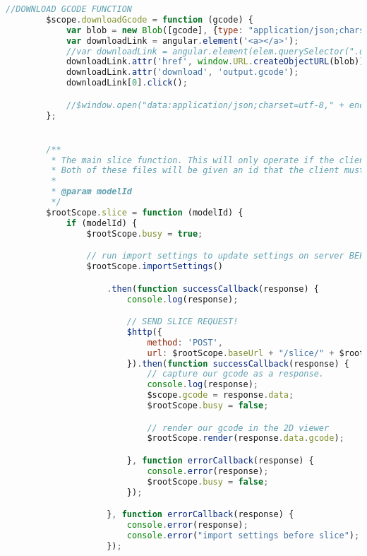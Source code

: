 \begin{lstlisting}[language=JavaScript, label={lst:app}, caption=Main app code where the angular module WebSlicer is defined. This is similar to a main function in C++.]
        //DOWNLOAD GCODE FUNCTION
        $scope.downloadGcode = function (gcode) {
            var blob = new Blob([gcode], {type: "application/json;charset=utf-8;"});
            var downloadLink = angular.element('<a></a>');
            //var downloadLink = angular.element(elem.querySelector(".downloadGcode"));
            downloadLink.attr('href', window.URL.createObjectURL(blob));
            downloadLink.attr('download', 'output.gcode');
            downloadLink[0].click();

            //$window.open("data:application/json;charset=utf-8," + encodeURIComponent(gcode));
        };


        /**
         * The main slice function. This will only operate if the client has both uploaded a settings file and a model file.
         * Both of these files will be given an id that the client must track in order to slice a file properly.
         *
         * @param modelId
         */
        $rootScope.slice = function (modelId) {
            if (modelId) {
                $rootScope.busy = true;

                // run import settings to update settings on server BEFORE SLICING
                $rootScope.importSettings()

                    .then(function successCallback(response) {
                        console.log(response);

                        // SEND SLICE REQUEST!
                        $http({
                            method: 'POST',
                            url: $rootScope.baseUrl + "/slice/" + $rootScope.clientId + "/" + modelId
                        }).then(function successCallback(response) {
                            // capture our gcode as a response.
                            console.log(response);
                            $scope.gcode = response.data;
                            $rootScope.busy = false;

                            // render our gcode in the 2D viewer
                            $rootScope.render(response.data.gcode);

                        }, function errorCallback(response) {
                            console.error(response);
                            $rootScope.busy = false;
                        });

                    }, function errorCallback(response) {
                        console.error(response);
                        console.error("import settings before slice");
                    });


\end{lstlisting}
